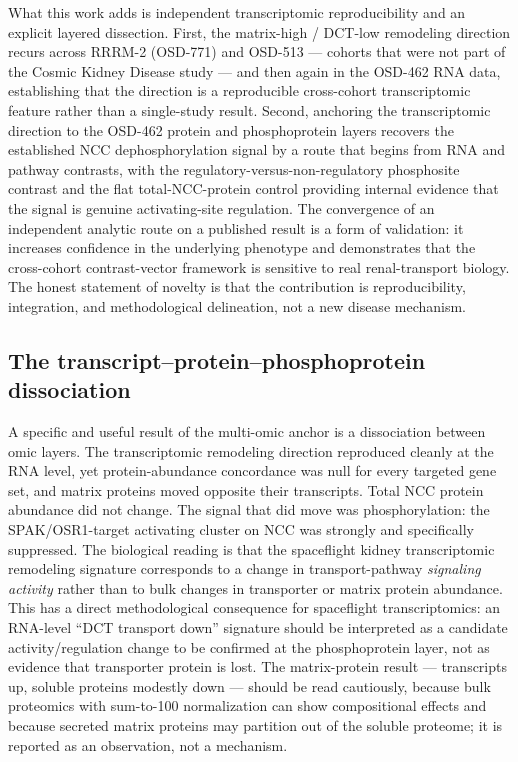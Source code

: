 \documentclass[11pt]{article}
\begin{document}
What this work adds is independent transcriptomic reproducibility and an explicit layered dissection. First, the matrix-high / DCT-low remodeling direction recurs across RRRM-2 (OSD-771) and OSD-513 --- cohorts that were not part of the Cosmic Kidney Disease study --- and then again in the OSD-462 RNA data, establishing that the direction is a reproducible cross-cohort transcriptomic feature rather than a single-study result. Second, anchoring the transcriptomic direction to the OSD-462 protein and phosphoprotein layers recovers the established NCC dephosphorylation signal by a route that begins from RNA and pathway contrasts, with the regulatory-versus-non-regulatory phosphosite contrast and the flat total-NCC-protein control providing internal evidence that the signal is genuine activating-site regulation. The convergence of an independent analytic route on a published result is a form of validation: it increases confidence in the underlying phenotype and demonstrates that the cross-cohort contrast-vector framework is sensitive to real renal-transport biology. The honest statement of novelty is that the contribution is reproducibility, integration, and methodological delineation, not a new disease mechanism.

\subsection{The transcript--protein--phosphoprotein dissociation}

A specific and useful result of the multi-omic anchor is a dissociation between omic layers. The transcriptomic remodeling direction reproduced cleanly at the RNA level, yet protein-abundance concordance was null for every targeted gene set, and matrix proteins moved opposite their transcripts. Total NCC protein abundance did not change. The signal that did move was phosphorylation: the SPAK/OSR1-target activating cluster on NCC was strongly and specifically suppressed. The biological reading is that the spaceflight kidney transcriptomic remodeling signature corresponds to a change in transport-pathway \emph{signaling activity} rather than to bulk changes in transporter or matrix protein abundance. This has a direct methodological consequence for spaceflight transcriptomics: an RNA-level ``DCT transport down'' signature should be interpreted as a candidate activity/regulation change to be confirmed at the phosphoprotein layer, not as evidence that transporter protein is lost. The matrix-protein result --- transcripts up, soluble proteins modestly down --- should be read cautiously, because bulk proteomics with sum-to-100 normalization can show compositional effects and because secreted matrix proteins may partition out of the soluble proteome; it is reported as an observation, not a mechanism.
\end{document}
